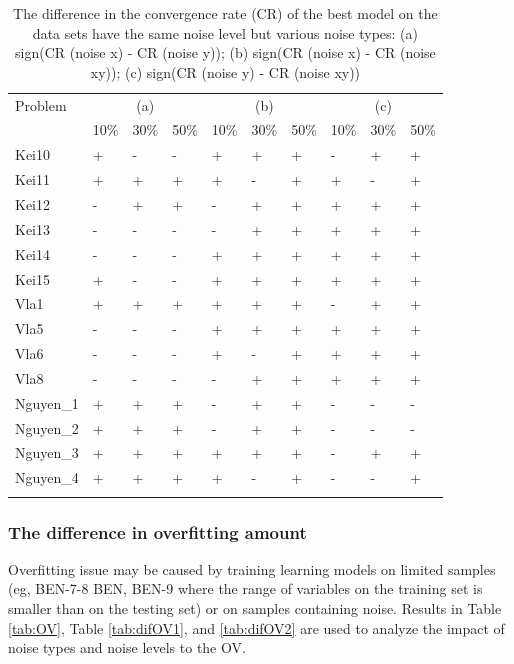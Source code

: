 \begin{table}
\caption{The difference in the convergence rate (CR) of the best model on the data sets have the same noise level but various noise types: (a) sign(CR (noise x) - CR (noise y)); (b) sign(CR (noise x) - CR (noise xy)); (c) sign(CR (noise y) - CR (noise xy))}
\label{tab:difCR2}
\begin{tabular}{l|lll|lll|lll}
\hline\noalign{\smallskip}
Problem & \multicolumn{3}{c|}{(a)} & \multicolumn{3}{c|}{(b)} & \multicolumn{3}{c}{(c)} \\
 & 10\% & 30\%  & 50\%  & 10\% & 30\% & 50\% & 10\% & 30\%  & 50\% \\
\noalign{\smallskip}\hline\noalign{\smallskip}
Kei10 & + & - & - & + & + & + & - & + & + \\
Kei11 & + & + & + & + & - & + & + & - & + \\
Kei12 & - & + & + & - & + & + & + & + & + \\
Kei13 & - & - & - & - & + & + & + & + & + \\
Kei14 & - & - & - & + & + & + & + & + & + \\
Kei15 & + & - & - & + & + & + & + & + & + \\
Vla1 & + & + & + & + & + & + & - & + & + \\
Vla5 & - & - & - & + & + & + & + & + & + \\
Vla6 & - & - & - & + & - & + & + & + & + \\
Vla8 & - & - & - & - & + & + & + & + & + \\
Nguyen\_1 & + & + & + & - & + & + & - & - & - \\
Nguyen\_2 & + & + & + & - & + & + & - & - & - \\
Nguyen\_3 & + & + & + & + & + & + & - & + & + \\
Nguyen\_4 & + & + & + & + & - & + & - & - & + \\
\noalign{\smallskip}\hline
\end{tabular}
\end{table}


\subsubsection {The difference in overfitting amount}
\label{AnaDiffOV}

Overfitting issue may be caused by training learning models on limited samples (eg, BEN-7-8 BEN, BEN-9 where the range of variables on the training set is smaller than on the testing set) or on samples containing noise. Results in Table \ref{tab:OV}, Table \ref{tab:difOV1}, and \ref{tab:difOV2} are used to analyze the impact of noise types and noise levels to the OV. \par

